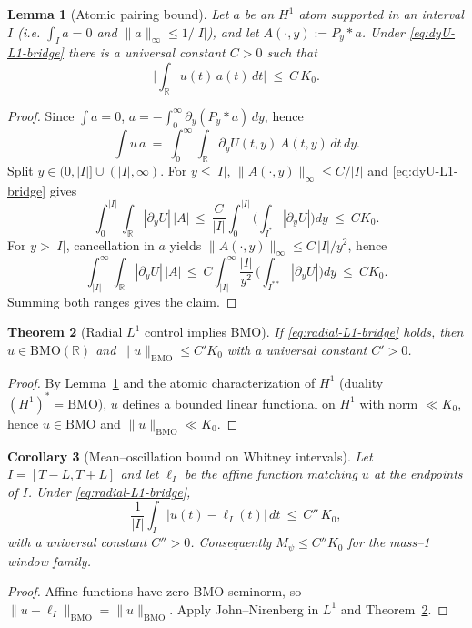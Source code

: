 \documentclass[11pt]{article}
\newtheorem{theorem}{Theorem}
\newtheorem{lemma}[theorem]{Lemma}
\newtheorem{corollary}[theorem]{Corollary}
\theoremstyle{definition}
\theoremstyle{remark}
\newcommand{\R}{\mathbb{R}}
\begin{document}
\begin{lemma}[Atomic pairing bound]\label{lem:atomic-pairing}
Let $a$ be an $H^1$ atom supported in an interval $I$ (i.e. $\int_I a=0$ and $\|a\|_{\infty}\le 1/|I|$), and let $A(\cdot,y):=P_y*a$. Under \eqref{eq:dyU-L1-bridge} there is a universal constant $C>0$ such that
\[
  \Big|\int_{\R} u(t)\,a(t)\,dt\Big|\ \le\ C\,K_0.
\]
\end{lemma}
\begin{proof}
Since $\int a=0$, $a=-\int_0^{\infty} \partial_y(P_y*a)\,dy$, hence
\[ \int u\,a\ =\ \int_0^{\infty}\!\int_{\R} \partial_y U(t,y)\,A(t,y)\,dt\,dy. \]
Split $y\in(0,|I|]\cup(|I|,\infty)$. For $y\le |I|$, $\|A(\cdot,y)\|_{\infty}\le C/|I|$ and \eqref{eq:dyU-L1-bridge} gives
\[ \int_0^{|I|}\!\int_{\R} |\partial_y U|\,|A|\,\le\ \frac{C}{|I|}\!\int_0^{|I|}\!\Big(\int_{I^*}\!|\partial_y U|\Big)dy\ \le\ C K_0. \]
For $y>|I|$, cancellation in $a$ yields $\|A(\cdot,y)\|_{\infty}\le C\,|I|/y^2$, hence
\[ \int_{|I|}^{\infty}\!\int_{\R} |\partial_y U|\,|A|\,\le\ C\!\int_{|I|}^{\infty}\!\frac{|I|}{y^2}\,\Big(\int_{I^{**}}\!|\partial_y U|\Big)dy\ \le\ C K_0. \]
Summing both ranges gives the claim.
\end{proof}

\begin{theorem}[Radial $L^1$ control implies BMO]\label{thm:L1toBMO}
If \eqref{eq:radial-L1-bridge} holds, then $u\in\mathrm{BMO}(\R)$ and $\|u\|_{\mathrm{BMO}}\le C' K_0$ with a universal constant $C'>0$.
\end{theorem}
\begin{proof}
By Lemma~\ref{lem:atomic-pairing} and the atomic characterization of $H^1$ (duality $(H^1)^*=\mathrm{BMO}$), $u$ defines a bounded linear functional on $H^1$ with norm $\ll K_0$, hence $u\in\mathrm{BMO}$ and $\|u\|_{\mathrm{BMO}}\ll K_0$.
\end{proof}

\begin{corollary}[Mean–oscillation bound on Whitney intervals]\label{cor:Mpsi-from-BMO}
Let $I=[T-L,T+L]$ and let $\ell_I$ be the affine function matching $u$ at the endpoints of $I$. Under \eqref{eq:radial-L1-bridge},
\[
  \frac{1}{|I|}\int_I |u(t)-\ell_I(t)|\,dt\ \le\ C''\,K_0,
\]
with a universal constant $C''>0$. Consequently $M_\psi\le C''K_0$ for the mass–1 window family.
\end{corollary}
\begin{proof}
Affine functions have zero BMO seminorm, so $\|u-\ell_I\|_{\mathrm{BMO}}=\|u\|_{\mathrm{BMO}}$. Apply John–Nirenberg in $L^1$ and Theorem~\ref{thm:L1toBMO}.
\end{proof}
\end{document}
